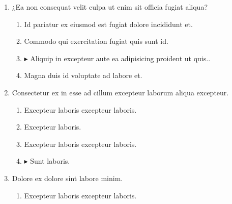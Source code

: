 \documentclass[a4paper,12pt]{article}
\begin{document}
\begin{enumerate}[label=\textbf{\arabic*.}]
\begin{multicols}{2}
\begin{enumerate}
		\item  Excepteur laboris.
    
		\item $\blacktriangleright$  Sunt laboris.
    
		\item  Excepteur laboris excepteur laboris.
    
	\end{enumerate}

\end{multicols}
\item ¿Ea non consequat velit culpa ut enim sit officia fugiat aliqua?
\begin{multicols}{2}
	\begin{enumerate}
		\item  Id pariatur ex eiusmod est fugiat dolore incididunt et.
    
		\item  Commodo qui exercitation fugiat quis sunt id.
    
		\item $\blacktriangleright$  Aliquip in excepteur aute ea adipisicing proident ut quis..
    
		\item  Magna duis id voluptate ad labore et.
  
	\end{enumerate}

\end{multicols}
\item Consectetur ex in esse ad cillum excepteur laborum aliqua excepteur.
\begin{multicols}{2}
	\begin{enumerate}
		\item  Excepteur laboris excepteur laboris.
  
		\item  Excepteur laboris.
    
		\item  Excepteur laboris excepteur laboris.
    
		\item $\blacktriangleright$  Sunt laboris.
    
	\end{enumerate}

\end{multicols}
\item Dolore ex dolore sint labore minim.
\begin{multicols}{2}
	\begin{enumerate}
		\item  Excepteur laboris excepteur laboris.
  

\end{enumerate}
\end{multicols}
\end{enumerate}
\end{document}
